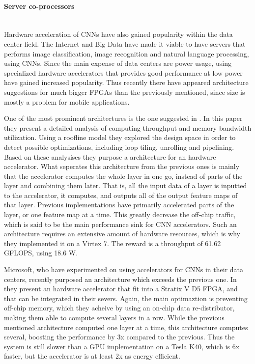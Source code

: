 \paragraph{Server co-processors} \hfil \\
Hardware acceleration of CNNs have also gained popularity within the data center field. The Internet and Big Data have made it viable to have servers that performs image classification, image recognition and natural language processing, using CNNs. Since the main expense of data centers are power usage, using specialized hardware accelerators that provides good performance at low power have gained increased popularity. Thus recently there have appeared architecture suggestions for much bigger FPGAs than the previously mentioned, since size is mostly a problem for mobile applications. 

One of the most prominent architectures is the one suggested in \cite{Virtex_paper}. In this paper they present a detailed analysis of computing throughput and memory bandwidth utilization. Using a roofline model \cite{roofline_model} they explored the design space in order to detect possible optimizations, including loop tiling, unrolling and pipelining. Based on these analysises they purpose a architecture for an hardware accelerator. What seperates this architecture from the previous ones is mainly that the accelerator computes the whole layer in one go, instead of parts of the layer and combining them later. That is, all the input data of a layer is inputted to the accelerator, it computes, and outputs all of the output feature maps of that layer. Previous implementations have primarily accelerated parts of the layer, or one feature map at a time. This greatly decrease the off-chip traffic, which is said to be the main performance sink for CNN accelerators. Such an architecture requires an extensive amount of hardware resources, which is why they implemented it on a Virtex 7. The reward is a throughput of 61.62 GFLOPS, using 18.6 W.   

Microsoft, who have experimented on using accelerators for CNNs in their data centers, recently purposed an architecture which exceeds the previous one. In \cite{Microsoft_paper} they present an hardware accelerator that fit into a Stratix V D5 FPGA, and that can be integrated in their severs. Again, the main optimaztion is preventing off-chip memory, which they acheive by using an on-chip data re-distributor, making them able to compute several layers in a row. While the previous mentioned architecture computed one layer at a time, this architecture computes several, boosting the performance by 3x compared to the previous. Thus the system is still slower than a GPU implementation on a Tesla K40, which is 6x faster, but the accelerator is at least 2x as energy efficient.
 

